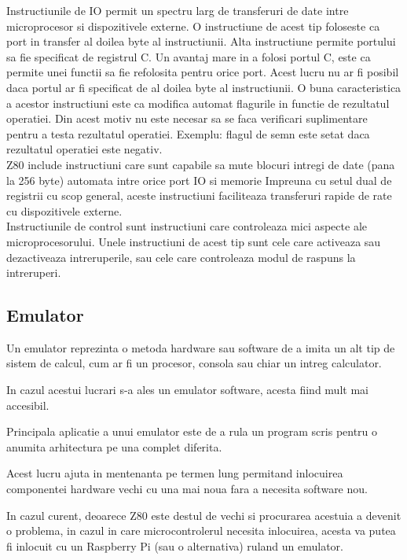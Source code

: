 \documentclass[titlepage,12pt]{article}
\begin{document}
Instructiunile de \ac {IO} permit un spectru larg de transferuri de date intre microprocesor si dispozitivele externe.
O instructiune de acest tip foloseste ca port in transfer al doilea byte al instructiunii.
Alta instructiune permite portului sa fie specificat de registrul C.
Un avantaj mare in a folosi portul C, este ca permite unei functii sa fie refolosita pentru orice port.
Acest lucru nu ar fi posibil daca portul ar fi specificat de al doilea byte al instructiunii.
O buna caracteristica a acestor instructiuni este ca modifica automat flagurile in functie de rezultatul operatiei.
Din acest motiv nu este necesar sa se faca verificari suplimentare pentru a testa rezultatul operatiei. Exemplu: flagul de semn este setat daca rezultatul operatiei este negativ.\\

\ac {Z80} include instructiuni care sunt capabile sa mute blocuri intregi de date (pana la 256 byte) automata intre orice port \ac {IO} si memorie
Impreuna cu setul dual de registrii cu scop general, aceste instructiuni faciliteaza transferuri rapide de rate cu dispozitivele externe.\\

Instructiunile de control sunt instructiuni care controleaza mici aspecte ale microprocesorului.
Unele instructiuni de acest tip sunt cele care activeaza sau dezactiveaza intreruperile, sau cele care controleaza modul de raspuns la intreruperi.

\subsection{Emulator}
Un emulator reprezinta o metoda hardware sau software de a imita un alt tip de sistem de calcul, cum ar fi un procesor, consola sau chiar un intreg calculator.

In cazul acestui lucrari s-a ales un emulator software, acesta fiind mult mai accesibil.

Principala aplicatie a unui emulator este de a rula un program scris pentru o anumita arhitectura pe una complet diferita.

Acest lucru ajuta in mentenanta pe termen lung permitand inlocuirea componentei hardware vechi cu una mai noua fara a necesita software nou.

In cazul curent, deoarece \ac {Z80} este destul de vechi si procurarea acestuia a devenit o problema, in cazul in care microcontrolerul necesita inlocuirea, acesta va putea fi inlocuit cu un Raspberry Pi (sau o alternativa) ruland un emulator.
\end{document}
